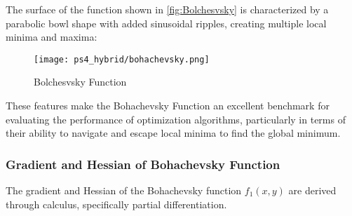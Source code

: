 \documentclass{article} %
\theoremstyle{definition}
\theoremstyle{remark}
\theoremstyle{plain}
\begin{document}
        The surface of the function shown in \autoref{fig:Bolchesvsky} is characterized by a parabolic bowl shape with added sinusoidal ripples, creating multiple local minima and maxima:
        
        \begin{figure}[h!]
            \centering
            \texttt{[image: ps4\_hybrid/bohachevsky.png]}
            \caption{Bolchesvsky Function}
            \label{fig:Bolchesvsky}
        \end{figure}

        These features make the Bohachevsky Function an excellent benchmark for evaluating the performance of optimization algorithms, particularly in terms of their ability to navigate and escape local minima to find the global minimum.
    \subsubsection{Gradient and Hessian of Bohachevsky Function}
        The gradient and Hessian of the Bohachevsky function \( f_1(x, y) \) are derived through calculus, specifically partial differentiation.
\end{document}
